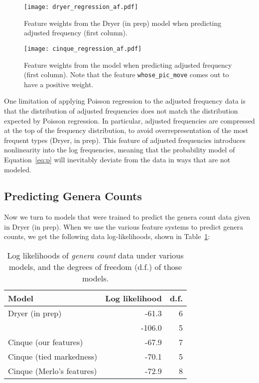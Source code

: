 \documentclass[11pt]{article}
\begin{document}
\begin{figure}[ht!]
  \centering
  \texttt{[image: dryer\_regression\_af.pdf]}
  \caption{Feature weights from the Dryer (in prep) model when predicting adjusted frequency (first column).}
  \label{fig:dryer-model}
\end{figure}

\begin{figure}[ht!]
  \centering
  \texttt{[image: cinque\_regression\_af.pdf]}
  \cprotect\caption{Feature weights from the \citet{cinque2005deriving} model when predicting adjusted frequency (first column). Note that the feature \verb+whose_pic_move+ comes out to have a positive weight.}
  \label{fig:cinque-model}
\end{figure}

One limitation of applying Poisson regression to the adjusted frequency data is that the distribution of adjusted frequencies does not match the distribution expected by Poisson regression. In particular, adjusted frequencies are compressed at the top of the frequency distribution, to avoid overrepresentation of the most frequent types (Dryer, in prep). This feature of adjusted frequencies introduces nonlinearity into the log frequencies, meaning that the probability model of Equation~\ref{eq:p} will inevitably deviate from the data in ways that are not modeled.

\subsection{Predicting Genera Counts}

Now we turn to models that were trained to predict the genera count data given in Dryer (in prep).
When we use the various feature systems to predict genera counts, we get the following data log-likelihoods, shown in Table~\ref{tab:genera-likelihoods}:

\begin{table}
  \centering
  \begin{tabular}{|l|r|r|}
    \hline
    Model & Log likelihood & d.f. \\
    \hline
    Dryer (in prep) & -61.3 & 6 \\
    \citet{cysouw2010dealing} & -106.0 & 5 \\
    Cinque (our features) & -67.9 & 7 \\
    Cinque (tied markedness) & -70.1 & 5 \\
    Cinque (Merlo's features) & -72.9 & 8 \\
    \hline 
  \end{tabular}
  \caption{Log likelihoods of \emph{genera count} data under various models, and the degrees of freedom (d.f.) of those models.}  
  \label{tab:genera-likelihoods}
\end{table}
\end{document}
